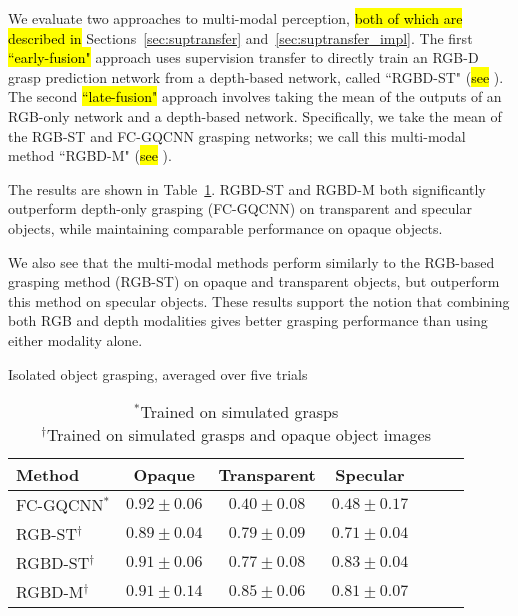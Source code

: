 We evaluate two approaches to multi-modal perception, \hl{both of which are described in} Sections~\ref{sec:suptransfer} and~\ref{sec:suptransfer_impl}. 
The first \hl{``early-fusion"} approach uses supervision transfer to directly train an RGB-D grasp prediction network from a depth-based network, called ``RGBD-ST" (\hl{see }).
The second \hl{``late-fusion"} approach involves taking the mean of the outputs of an RGB-only network and a depth-based network. 
Specifically, we take the mean of the RGB-ST and FC-GQCNN grasping networks; we call this multi-modal method ``RGBD-M" (\hl{see }). 

The results are shown in Table~\ref{table:indiv_eval}.  
RGBD-ST and RGBD-M both significantly outperform depth-only grasping (FC-GQCNN) on transparent and specular objects, while maintaining comparable performance on opaque objects. 

We also see that the multi-modal methods perform similarly to the RGB-based grasping method (RGB-ST) on opaque and transparent objects, but outperform this method on specular objects. These results support the notion that combining both RGB and depth modalities gives better grasping performance than using either modality alone.

\begin{table}[h]
    \centering
    \caption{Isolated object grasping, averaged over five trials}
    \label{table:indiv_eval}
    \begin{tabular}{l ccc ccc}
      \toprule
        Method & Opaque & Transparent & Specular \\
        \midrule
        FC-GQCNN$^*$ & 
            $\mathbf{0.92\pm0.06}$ & $0.40\pm0.08$ & $0.48\pm0.17$\\
        RGB-ST$^\dagger$ & 
            $0.89\pm0.04$ & $0.79\pm0.09$ & $0.71\pm0.04$\\
        RGBD-ST$^\dagger$ & 
            $0.91\pm0.06$ & $0.77\pm0.08$ & $\mathbf{0.83\pm0.04}$ \\
        RGBD-M$^\dagger$ & 
            $0.91\pm0.14$ & $\mathbf{0.85\pm0.06}$ & $0.81\pm0.07$\\
      \bottomrule
    \end{tabular}
    \vspace{7pt}
    \caption*{\footnotesize $^*$Trained on simulated grasps \\ $^\dagger$Trained on simulated grasps and opaque object images \\}
    \vspace{-3em}
\end{table}


